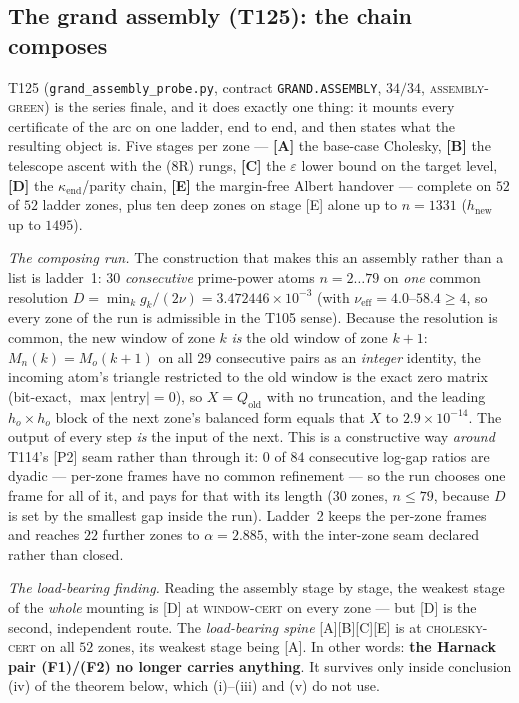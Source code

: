 \documentclass[11pt,a4paper]{article}
\begin{document}
\subsection{The grand assembly (T125): the chain composes}\label{sec:t125}
T125 (\texttt{grand\_assembly\_probe.py}, contract \texttt{GRAND.ASSEMBLY}, $34/34$,
\textsc{assembly-green}) is the series finale, and it does exactly one thing: it mounts every
certificate of the arc on one ladder, end to end, and then states what the resulting object is.
Five stages per zone --- \textbf{[A]} the base-case Cholesky, \textbf{[B]} the telescope ascent
with the (8R) rungs, \textbf{[C]} the $\varepsilon$ lower bound on the target level, \textbf{[D]}
the $\kappa_{\mathrm{end}}$/parity chain, \textbf{[E]} the margin-free Albert handover --- complete
on $52$ of $52$ ladder zones, plus ten deep zones on stage [E] alone up to $n=1331$
($h_{\mathrm{new}}$ up to $1495$).

\emph{The composing run.} The construction that makes this an assembly rather than a list is
ladder~1: $30$ \emph{consecutive} prime-power atoms $n=2\ldots79$ on \emph{one} common resolution
$D=\min_kg_k/(2\nu)=3.472446\times10^{-3}$ (with $\nu_{\mathrm{eff}}=4.0$--$58.4\ge4$, so every zone
of the run is admissible in the T105 sense). Because the resolution is common, the new window of
zone $k$ \emph{is} the old window of zone $k+1$: $M_n(k)=M_o(k+1)$ on all $29$ consecutive pairs as
an \emph{integer} identity, the incoming atom's triangle restricted to the old window is the exact
zero matrix (bit-exact, $\max|\text{entry}|=0$), so $X=Q_{\mathrm{old}}$ with no truncation, and the
leading $h_o\times h_o$ block of the next zone's balanced form equals that $X$ to
$2.9\times10^{-14}$. The output of every step \emph{is} the input of the next. This is a
constructive way \emph{around} T114's [P2] seam rather than through it: $0$ of $84$ consecutive
log-gap ratios are dyadic --- per-zone frames have no common refinement --- so the run chooses one
frame for all of it, and pays for that with its length ($30$ zones, $n\le79$, because $D$ is set by
the smallest gap inside the run). Ladder~2 keeps the per-zone frames and reaches $22$ further zones
to $\alpha=2.885$, with the inter-zone seam declared rather than closed.

\emph{The load-bearing finding.} Reading the assembly stage by stage, the weakest stage of the
\emph{whole} mounting is [D] at \textsc{window-cert} on every zone --- but [D] is the second,
independent route. The \emph{load-bearing spine} [A][B][C][E] is at \textsc{cholesky-cert} on all
$52$ zones, its weakest stage being [A]. In other words: \textbf{the Harnack pair (F1)/(F2) no
longer carries anything}. It survives only inside conclusion (iv) of the theorem below, which
(i)--(iii) and (v) do not use.
\end{document}

